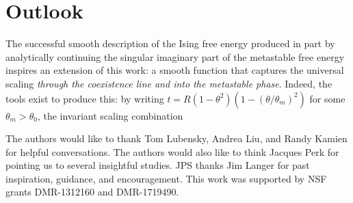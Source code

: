 \documentclass[
aps,
pre,
preprint,
longbibliography,
floatfix
]{revtex4-2}
\begin{document}
\section{Outlook}

The successful smooth description of the Ising free energy produced in part by analytically continuing the singular imaginary part of the metastable free energy inspires an extension of this work: a smooth function that captures the universal scaling \emph{through the coexistence line and into the metastable phase}. Indeed, the tools exist to produce this: by writing $t=R(1-\theta^2)(1-(\theta/\theta_m)^2)$ for some $\theta_m>\theta_0$, the invariant scaling combination

\begin{acknowledgments}
  The authors would like to thank Tom Lubensky, Andrea Liu, and Randy Kamien
  for helpful conversations. The authors would also like to think Jacques Perk
  for pointing us to several insightful studies. JPS thanks Jim Langer for past
  inspiration, guidance, and encouragement. This work was supported by NSF
  grants DMR-1312160 and DMR-1719490.
\end{acknowledgments}


\end{document}
